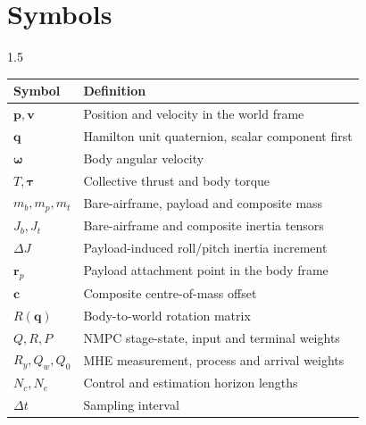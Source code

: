 \chapter*{\centering Symbols}

\begin{spacing}{1.5}
\setlength{\parskip}{0.1in}
\begin{table}[ht]
\centering
\begin{tabular}{@{}ll@{}}
\toprule
\textbf{Symbol} & \textbf{Definition} \\
\midrule
$\bm{p},\bm{v}$ & Position and velocity in the world frame \\
$\bm{q}$ & Hamilton unit quaternion, scalar component first \\
$\bm{\omega}$ & Body angular velocity \\
$T,\bm{\tau}$ & Collective thrust and body torque \\
$m_b,m_p,m_t$ & Bare-airframe, payload and composite mass \\
$J_b,J_t$ & Bare-airframe and composite inertia tensors \\
$\Delta J$ & Payload-induced roll/pitch inertia increment \\
$\bm{r}_p$ & Payload attachment point in the body frame \\
$\bm{c}$ & Composite centre-of-mass offset \\
$R(\bm{q})$ & Body-to-world rotation matrix \\
$Q,R,P$ & NMPC stage-state, input and terminal weights \\
$R_y,Q_w,Q_0$ & MHE measurement, process and arrival weights \\
$N_c,N_e$ & Control and estimation horizon lengths \\
$\Delta t$ & Sampling interval \\
\bottomrule
\end{tabular}
\end{table}
\end{spacing}
\newpage

